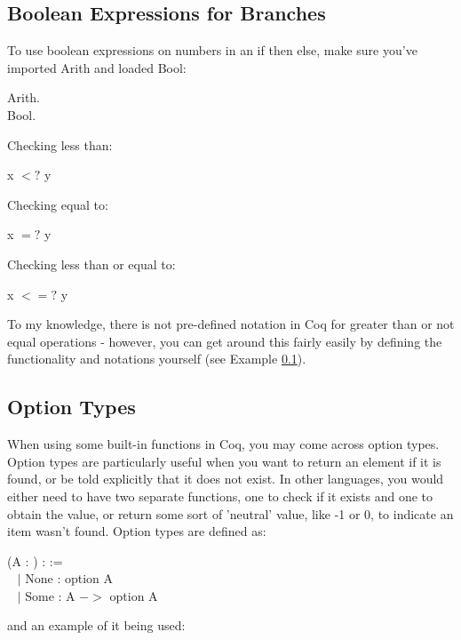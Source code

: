 \subsection{Boolean Expressions for Branches} \label{bool_expr} 
To use boolean expressions on numbers in an if then else, make sure you've imported Arith and loaded Bool:
\begin{code}
	 Arith.	\\
	\Load Bool.
\end{code}

Checking less than:
\begin{code}
	x $<?$ y 
\end{code}

Checking equal to:
\begin{code}
	x $=?$ y
\end{code}

Checking less than or equal to:
\begin{code}
	x $<=?$ y
\end{code}

\noindent
To my knowledge, there is not pre-defined notation in Coq for greater than or not equal operations - however, you can get around this fairly easily by defining the functionality and notations yourself  (see Example \ref{bool_expr}).






\subsection{Option Types} \label{opt_ty}
When using some built-in functions in Coq, you may come across option types. 
Option types are particularly useful when you want to return an element if it is found, or be told explicitly that it does not exist.
In other languages, you would either need to have two separate functions, one to check if it exists and one to obtain the value, or return some sort of 'neutral' value, like -1 or 0, to indicate an item wasn't found.
Option types are defined as: 

\begin{code} 
	\Inductive {} (A : \Type) : \Type :=	\\ \-\ \quad
	$\mid$ None : option A					\\ \-\ \quad
	$\mid$ Some : A $->$ option A
\end{code}

and an example of it being used:

